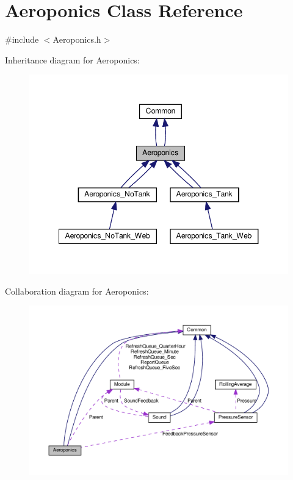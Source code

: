 \hypertarget{class_aeroponics}{}\section{Aeroponics Class Reference}
\label{class_aeroponics}


{\ttfamily \#include $<$Aeroponics.\+h$>$}



Inheritance diagram for Aeroponics\+:
\nopagebreak
\begin{figure}[H]
\begin{center}
\leavevmode
\includegraphics[width=348pt]{class_aeroponics__inherit__graph}
\end{center}
\end{figure}


Collaboration diagram for Aeroponics\+:
\nopagebreak
\begin{figure}[H]
\begin{center}
\leavevmode
\includegraphics[width=350pt]{class_aeroponics__coll__graph}
\end{center}
\end{figure}
